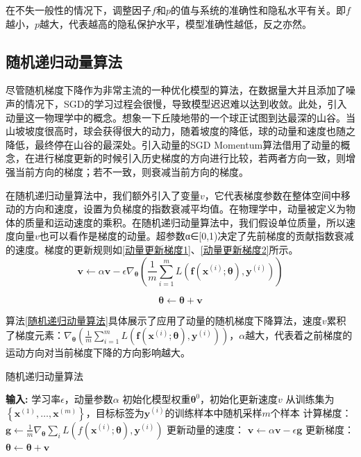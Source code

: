 在不失一般性的情况下，调整因子$f$和$p$的值与系统的准确性和隐私水平有关。即$f$越小，$p$越大，代表越高的隐私保护水平，模型准确性越低，反之亦然。

\subsection{随机递归动量算法}
尽管随机梯度下降作为非常主流的一种优化模型的算法，在数据量大并且添加了噪声的情况下，SGD的学习过程会很慢，导致模型迟迟难以达到收敛。此处，引入动量这一物理学中的概念。想象一下丘陵地带的一个球正试图到达最深的山谷。当山坡坡度很高时，球会获得很大的动力，随着坡度的降低，球的动量和速度也随之降低，最终停在山谷的最深处。引入动量的SGD Momentum算法借用了动量的概念，在进行梯度更新的时候引入历史梯度的方向进行比较，若两者方向一致，则增强当前方向的梯度；若不一致，则衰减当前方向的梯度。

在随机递归动量算法中，我们额外引入了变量$v$，它代表梯度参数在整体空间中移动的方向和速度，设置为负梯度的指数衰减平均值。在物理学中，动量被定义为物体的质量和运动速度的乘积。在随机递归动量算法中，我们假设单位质量，所以速度向量$v$也可以看作是梯度的动量。超参数α∈[0,1)决定了先前梯度的贡献指数衰减的速度。梯度的更新规则如\ref{动量更新梯度1}、\ref{动量更新梯度2}所示。
\begin{equation}\label{动量更新梯度1}
\boldsymbol{v} \leftarrow \alpha \boldsymbol{v}-\epsilon \nabla_{\boldsymbol{\theta}}\left(\frac{1}{m} \sum_{i=1}^{m} L\left(\boldsymbol{f}\left(\boldsymbol{x}^{(i)} ; \boldsymbol{\theta}\right), \boldsymbol{y}^{(i)}\right)\right)
\end{equation}

\begin{equation}\label{动量更新梯度2}
\boldsymbol{\theta} \leftarrow \boldsymbol{\theta}+\boldsymbol{v}
\end{equation}

算法\ref{随机递归动量算法}具体展示了应用了动量的随机梯度下降算法，速度$v$累积了梯度元素：$\nabla_{\boldsymbol{\theta}}\left(\frac{1}{m} \sum_{i=1}^{m} L\left(\boldsymbol{f}\left(\boldsymbol{x}^{(i)} ; \boldsymbol{\theta}\right), \boldsymbol{y}^{(i)}\right)\right)$，$\alpha$越大，代表着之前梯度的运动方向对当前梯度下降的方向影响越大。

\begin{algorithm}[!htb]
	\caption{随机递归动量算法}
	\label{随机递归动量算法}
	\begin{algorithmic}[1]
		\footnotesize
		\STATE \textbf{输入:} 学习率$\epsilon$，动量参数$\alpha$
		\STATE 初始化模型权重$\boldsymbol{\theta}^{0}$，初始化更新速度$v$
			\STATE 从训练集为$\left\{\boldsymbol{x}^{(1)}, \ldots,\boldsymbol{x}^{(m)}\right\}$，目标标签为$\boldsymbol{y}^{(i)}$的训练样本中随机采样$m$个样本
			\STATE 计算梯度：$\boldsymbol{g} \leftarrow \frac{1}{m} \nabla_{\boldsymbol{\theta}} \sum_{i} L\left(f\left(\boldsymbol{x}^{(i)} ; \boldsymbol{\theta}\right), \boldsymbol{y}^{(i)}\right)$
			\STATE 更新动量的速度： $\boldsymbol{v} \leftarrow \alpha \boldsymbol{v}-\epsilon \boldsymbol{g}$
			\STATE 更新梯度：$\boldsymbol{\theta} \leftarrow \boldsymbol{\theta}+\boldsymbol{v}$
		\ENDWHILE
	\end{algorithmic}
\end{algorithm}

